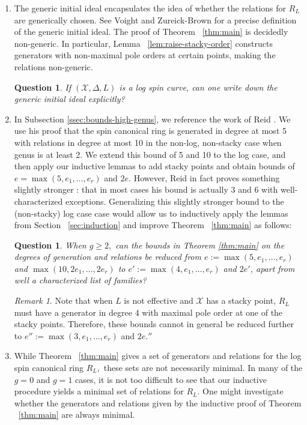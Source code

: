 \documentclass{amsart}
\theoremstyle{plain}
\newtheorem{question}[thm]{Question}
\theoremstyle{definition}
\theoremstyle{remark}
\newtheorem{rem}[thm]{Remark}
\numberwithin{equation}{section}
\newcommand\sx{\mathscr X}
\newcommand{\halfcan}{L}
\begin{document}
\begin{enumerate}
	\item The generic initial ideal
		encapsulates the idea of whether the relations for $R_\halfcan$ are 
		generically chosen. See Voight and Zureick-Brown \cite[Definition 2.2.7]{vzb:stacky} for a precise definition of the generic initial ideal.
		The proof of Theorem
		~\ref{thm:main} is decidedly non-generic. 
		In particular, Lemma ~\ref{lem:raise-stacky-order} 
		constructs generators with non-maximal pole orders at certain 
		points, making the relations non-generic. 
		\begin{question}
		\label{ques:generic-initial}
			If $(\sx, \Delta, \halfcan)$ is a log spin curve, can one write down the
			generic initial ideal explicitly?
		\end{question}
		
	\item In Subsection \ref{ssec:bounds-high-genus}, we reference 
		the work of Reid \cite[Theorem 3.4]{reid:infinitesimal}. We use his 
		proof that the 
		spin canonical ring is generated in degree at most 5 with
		relations in degree at most 10 in the 			
		non-log, non-stacky case when genus is at least 2. We extend this 
		bound of 5 and 10 to the log case, and then apply our inductive 
		lemmas to add stacky points and obtain bounds of $e = \max(5,e_1, \ldots, e_r)$ and $2e$.  However, Reid in fact proves something slightly stronger \cite[Theorem 3.4]{reid:infinitesimal}: that in 
		most cases his bound is actually 3 and 6 with well-characterized 
		exceptions.
		Generalizing this slightly stronger bound to the (non-stacky) log case case would allow us to inductively apply the lemmas from Section ~\ref{sec:induction} and improve Theorem ~\ref{thm:main} as follows:
		\begin{question}\label{ques:reduce-5,10-to-4,8}
			When $g \geq 2,$ can the bounds in Theorem \ref{thm:main} on 
			the degrees of generation and relations be reduced from 
			$e := \max(5, e_1, \ldots, e_r)$ and $\max(10, 2e_1, \ldots, 2e_r)$ to 
			$e' := \max(4, e_1, \ldots, e_r)$ and $2e'$, 
			apart from well a characterized list of families?
		\end{question}
		\begin{rem}\label{rem:reduce-3,6}
			Note that when $L$ is not effective and $\sx$ has a stacky point, $R_L$ must have a generator in degree 4 with maximal pole order at one of the stacky points.  Therefore, these bounds cannot in general be reduced further to 
			$e'' := \max(3, e_1, \ldots, e_r)$ and $2e.''$
			\end{rem}
	\item While Theorem ~\ref{thm:main} gives a set of 
		generators and relations
		for the log spin canonical ring $R_\halfcan,$ these sets are not necessarily minimal.
		In many of the $g = 0$ and $g = 1$ cases, 
		it is not too difficult to see that our inductive procedure
		yields a minimal set of relations for $R_\halfcan$. One might investigate 
		whether the generators and relations given by the inductive proof 
		of Theorem ~\ref{thm:main} are always minimal.
		\end{enumerate}
\end{document}
